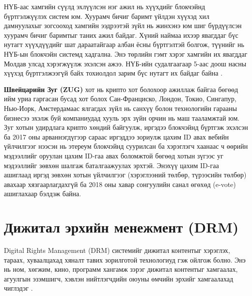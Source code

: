 НҮБ-аас хамгийн сүүлд эхлүүлсэн нэг ажил нь хүүхдийг блокчэйнд бүртгэлжүүлэх систем юм. Хуурамч бичиг баримт үйлдэн хүүхэд хил дамнуулахыг зогсооход хамгийн ээдрээтэй зүйл нь жинхэнэ юм шиг бүрдүүлсэн хуурамч бичиг баримтыг таних ажил байдаг. Хүний наймаа ихээр явагддаг бүс нутагт хүүхдүүдийг шат дараатайгаар албан ёсны бүртгэлтэй болгож, түүнийг нь НҮБ-ын блокчэйн системд хадгална. Энэ төрлийн гэмт хэрэг хамгийн их явагддаг Молдав улсад хэрэгжүүлж эхэлсэн ажээ. НҮБ-ийн судалгаагаар 5-аас доош насны хүүхэд бүртгэлжээгүй байх тохиолдол зарим бүс нутагт их байдаг байна \cite{un_child}.

\textbf{Швейцарийн Зуг (ZUG)} хот нь крипто хот болохоор ажиллаж
байгаа бөгөөд ийм уриа гаргасан бусад хот болох Сан-Франциско, Лондон, Токио, Сингапур, Нью-Иорк, Амстердамаас ялгагдах зүйл нь санхүү болон технологийн гарааны бизнесээ эхэлж буй компаниудад хууль эрх зүйн орчин нь маш тааламжтай юм. Зуг хотын удирдлага крипто хөндий байгуулж, иргэдээ блокчэйнд бүртгэж эхэлсэн ба 2017 оны арваннэгдүгээр сараас иргэддээ зориулж цахим ID авах вебийн үйлчилгээг нээсэн \cite{zug_digtal_id} нь этереум блокчэйнд суурилсан ба хэрэглэгч хаанаас ч өөрийн мэдээллийг оруулан цахим ID-гаа авах боломжтой бөгөөд хотын зүгээс уг мэдээллийг зөвхөн шалгаж баталгаажуулах эрхтэй. Энэхүү цахим ID-гаа ашиглаад иргэд зөвхөн хотын үйлчилгээг (хэрэглээний төлбөр, түрээсийн төлбөр) авахаар хязгаарлагдахгүй ба 2018 оны хавар сонгуулийн санал өгөхөд (e-vote) ашиглахаар бэлдэж байна.

\section{Дижитал эрхийн менежмент (DRM)}
Digital Rights Management (DRM) системийг дижитал контентыг хэрэглэх, тараах, хуваалцахад хяналт тавих зорилготой технологиуд гэж ойлгож болно. Энэ нь ном, хөгжим, кино, программ хангамж зэрэг дижитал контентыг хамгаалах, агуулгын эзэмшигч, хэвлэн нийтлэгчдийн оюуны өмчийн эрхийг хамгаалахад чиглэдэг \cite{drm}.

